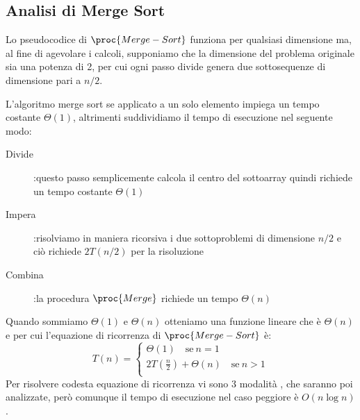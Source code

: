 \subsection{Analisi di Merge Sort}
Lo pseudocodice di $\proc{Merge-Sort}$ funziona per qualsiasi dimensione ma, al fine
di agevolare i calcoli, supponiamo che la dimensione del problema originale sia una
potenza di 2, per cui ogni passo divide genera due sottosequenze di dimensione pari a $n/2$.

L'algoritmo merge sort se applicato a un solo elemento impiega un tempo costante $\Theta(1)$,
altrimenti suddividiamo il tempo di esecuzione nel seguente modo:
\begin{description}
    \item[Divide]:questo passo semplicemente calcola il centro del sottoarray quindi
                  richiede un tempo costante $\Theta(1)$
    \item[Impera]:risolviamo in maniera ricorsiva i due sottoproblemi di dimensione $n/2$
                  e ciò richiede $2T(n/2)$ per la risoluzione
    \item[Combina]:la procedura $\proc{Merge}$ richiede un tempo $\Theta(n)$
\end{description}
Quando sommiamo $\Theta(1)$ e $\Theta(n)$ otteniamo una funzione lineare che è $\Theta(n)$
e per cui l'equazione di ricorrenza di $\proc{Merge-Sort}$ è:
\begin{equation*}
    T(n) = \begin{cases} \Theta(1) \quad \text{se} \ n = 1 \\
                         2T(\frac{n}{2}) + \Theta(n) \quad \text{se} \ n > 1 \\
           \end{cases}
\end{equation*}
Per risolvere codesta equazione di ricorrenza vi sono 3 modalità , che saranno poi analizzate,
però comunque il tempo di esecuzione nel caso peggiore è $O(n \log n)$.
